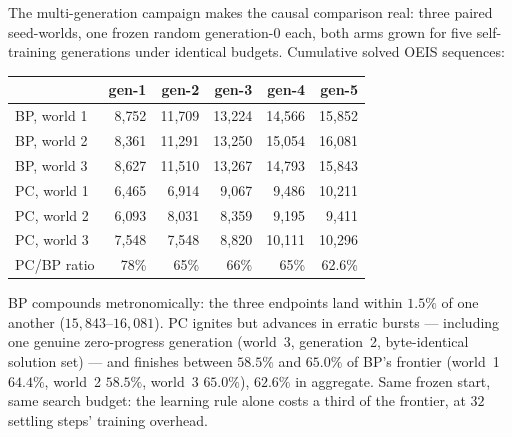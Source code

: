 \documentclass[11pt]{article}
\begin{document}
The multi-generation campaign makes the causal comparison real: three paired seed-worlds,
one frozen random generation-0 each, both arms grown for five self-training generations
under identical budgets. Cumulative solved OEIS sequences:

\begin{center}
\begin{tabular}{lrrrrr}
\toprule
 & gen-1 & gen-2 & gen-3 & gen-4 & gen-5 \\
\midrule
BP, world 1 & 8{,}752 & 11{,}709 & 13{,}224 & 14{,}566 & 15{,}852 \\
BP, world 2 & 8{,}361 & 11{,}291 & 13{,}250 & 15{,}054 & 16{,}081 \\
BP, world 3 & 8{,}627 & 11{,}510 & 13{,}267 & 14{,}793 & 15{,}843 \\
PC, world 1 & 6{,}465 & 6{,}914 & 9{,}067 & 9{,}486 & 10{,}211 \\
PC, world 2 & 6{,}093 & 8{,}031 & 8{,}359 & 9{,}195 & 9{,}411 \\
PC, world 3 & 7{,}548 & 7{,}548 & 8{,}820 & 10{,}111 & 10{,}296 \\
\midrule
PC/BP ratio & 78\% & 65\% & 66\% & 65\% & 62.6\% \\
\bottomrule
\end{tabular}
\end{center}

BP compounds metronomically: the three endpoints land within $1.5\%$ of one another
($15{,}843$--$16{,}081$). PC ignites but advances in erratic bursts
--- including one genuine zero-progress generation (world~3, generation~2, byte-identical
solution set) --- and finishes between $58.5\%$ and $65.0\%$ of BP's frontier (world~1
$64.4\%$, world~2 $58.5\%$, world~3 $65.0\%$), $62.6\%$ in aggregate. Same frozen start,
same search budget: the learning rule alone costs a third of the frontier, at
$32$ settling steps' training overhead.
\end{document}
